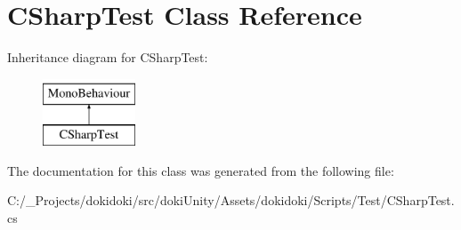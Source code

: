 \hypertarget{class_c_sharp_test}{}\section{C\+Sharp\+Test Class Reference}
\label{class_c_sharp_test}
Inheritance diagram for C\+Sharp\+Test\+:\begin{figure}[H]
\begin{center}
\leavevmode
\includegraphics[height=2.000000cm]{class_c_sharp_test}
\end{center}
\end{figure}


The documentation for this class was generated from the following file\+:\begin{DoxyCompactItemize}
\item 
C\+:/\+\_\+\+Projects/dokidoki/src/doki\+Unity/\+Assets/dokidoki/\+Scripts/\+Test/C\+Sharp\+Test.\+cs\end{DoxyCompactItemize}
